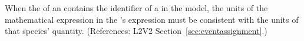 When the   of an \EventAssignment
contains the identifier of a \Species in the model, the
units of the mathematical expression in the
\EventAssignment's  expression must be
consistent with the units of that species' quantity.
(References: L2V2 Section~\ref{sec:eventassignment}.)
